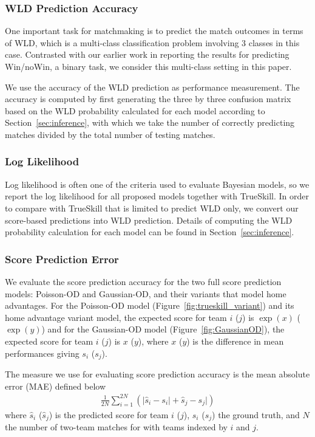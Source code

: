 \subsubsection{WLD Prediction Accuracy}
\label{sec:multiclassClassification}
One important task for matchmaking is to predict the match outcomes in terms of WLD, which is a multi-class classification problem involving 3 classes in this case. Contrasted with our earlier work in \cite{Guo:ECML2012} reporting the results for predicting Win/noWin, a binary task, we consider this multi-class setting in this paper.

We use the accuracy of the WLD prediction as performance measurement. The accuracy is computed by first generating the three by three confusion matrix based on the WLD probability calculated for each model according to Section~\ref{sec:inference}, with which we take the number of correctly predicting matches divided by the total number of testing matches. 

\subsubsection{Log Likelihood}
\label{sec:loglik}
Log likelihood is often one of the criteria used to evaluate Bayesian models, so we report the log likelihood for all proposed models together with TrueSkill. In order to compare with TrueSkill that is limited to predict WLD only, we convert our score-based predictions into WLD prediction. Details of computing the WLD probability calculation for each model can be found in Section~\ref{sec:inference}.

\subsubsection{Score Prediction Error}
\label{sec:scorePredictionError}

We evaluate the score prediction accuracy for the two full
score prediction models: Poisson-OD and Gaussian-OD, and their variants that model home advantages. 
For the Poisson-OD model (Figure~\ref{fig:trueskill_variant}) and its home advantage variant model, the
expected score for team $i$ ($j$) is $\exp(x)$ ($\exp(y)$) and for the
Gaussian-OD model
(Figure~\ref{fig:GaussianOD}), the expected score for team $i$ ($j$) is $x$ ($y$), where $x$ ($y$) is the
difference in mean performances giving $s_i$ ($s_j$).  

The measure we use for evaluating score prediction accuracy is the mean absolute error (MAE) defined below
\begin{align}
    \frac{1}{2N} \sum_{i=1}^{2N} \left(| \hat{s}_i - s_i | + \hat{s}_j - s_j |\right)
\end{align}
where $\hat{s}_i$ ($\hat{s}_j$) is the predicted score for team $i$ ($j$), $s_i$ ($s_j$) the ground truth, and $N$ the number of two-team matches for with teams indexed by $i$ and $j$. 


